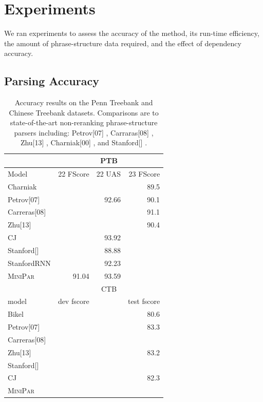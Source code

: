 \documentclass[11pt,letterpaper]{article}
\begin{document}


\section{Experiments}

We ran experiments to assess the accuracy of the method, its run-time efficiency, the amount of phrase-structure data required, and the effect of dependency accuracy.

\subsection{Parsing Accuracy}

\begin{table}
  \centering
  \small
  \begin{tabular}{|l|rrr|}
    \hline
    & \multicolumn{3}{|c|}{PTB} \\
    \hline

    \hline
    Model & 22 FScore & 22 UAS & 23 FScore  \\
    \hline
    Charniak          & & & 89.5\\
    Petrov[07]        & & 92.66 & 90.1 \\
    Carreras[08]      & &  & 91.1 \\
    Zhu[13]           & &  & 90.4 \\
    CJ                & & 93.92 & \\
    Stanford[]        & & 88.88 & \\
    StanfordRNN       & & 92.23 & \\
    \textsc{MiniPar} & 91.04 & 93.59 & \\
    \hline
    \hline
    & \multicolumn{3}{|c|}{CTB} \\
    model &  dev fscore & & test fscore  \\
    \hline

    \hline
    Bikel         & & & 80.6 \\
    Petrov[07]    & & & 83.3 \\
    Carreras[08]  & & & \\
    Zhu[13]       & & & 83.2 \\
    Stanford[]    & & & \\
    CJ  & & & 82.3 \\
    \textsc{MiniPar} & & & \\
    \hline
  \end{tabular}
  \label{tab:acc}
  \caption{ Accuracy results on the Penn Treebank and Chinese Treebank datasets. Comparisons are to state-of-the-art non-reranking phrase-structure parsers including:  Petrov[07] \cite{petrov2006learning}, Carraras[08] \cite{carreras2008tag}, Zhu[13] \cite{zhu2013fast}, Charniak[00] \cite{charniak2000maximum}, and Stanford[] \cite{}.    }
\end{table}
\end{document}
